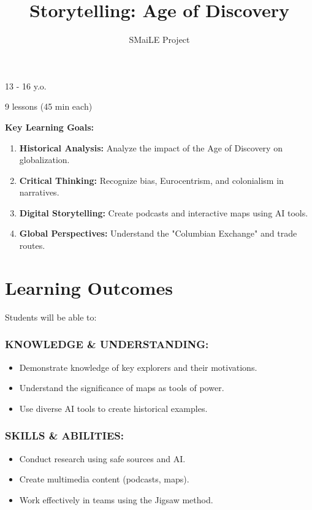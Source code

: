 \documentclass[11pt, a4paper]{article}
\begin{document}
\title{\textbf{\color{SmaileTeal}Storytelling: Age of Discovery}}
\author{SMaiLE Project}
\date{}
\maketitle
\thispagestyle{plain}

\begin{keyinfobox}
    \begin{description}[leftmargin=*, labelindent=0pt]
        \item[\bfseries\color{SmaileTeal} Target Group:] 13 - 16 y.o.
        \item[\bfseries\color{SmaileTeal} Duration:] 9 lessons (45 min each)
    \end{description}
    \textbf{Key Learning Goals:}
    \begin{enumerate}
        \item \textbf{Historical Analysis:} Analyze the impact of the Age of Discovery on globalization.
        \item \textbf{Critical Thinking:} Recognize bias, Eurocentrism, and colonialism in narratives.
        \item \textbf{Digital Storytelling:} Create podcasts and interactive maps using AI tools.
        \item \textbf{Global Perspectives:} Understand the "Columbian Exchange" and trade routes.
    \end{enumerate}
\end{keyinfobox}

\section*{Learning Outcomes}
Students will be able to:

\subsubsection*{KNOWLEDGE \& UNDERSTANDING:}
\begin{itemize}
    \item Demonstrate knowledge of key explorers and their motivations.
    \item Understand the significance of maps as tools of power.
    \item Use diverse AI tools to create historical examples.
\end{itemize}

\subsubsection*{SKILLS \& ABILITIES:}
\begin{itemize}
    \item Conduct research using safe sources and AI.
    \item Create multimedia content (podcasts, maps).
    \item Work effectively in teams using the Jigsaw method.
\end{itemize}
\end{document}
